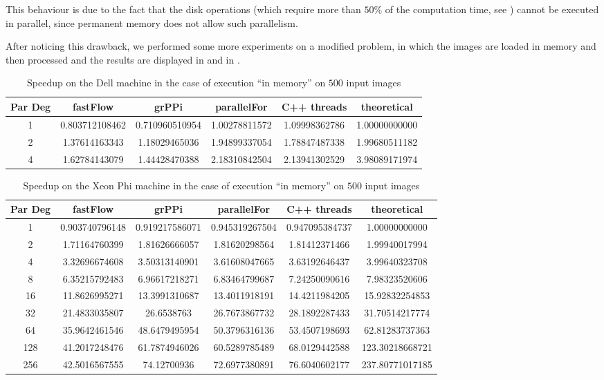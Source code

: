\documentclass[12pt,a4paper,english]{article}
\begin{document}
    This behaviour is due to the fact that the disk operations (which require more than $50\%$ of the computation time, see ) cannot be executed in parallel, since permanent memory does not allow such parallelism.

    After noticing this drawback, we performed some more experiments on a modified problem, in which the images are loaded in memory and then processed and the results are displayed in  and in .


\begin{table}[h]
\begin{tabular}{cccccc}
  {\bf Par Deg} & {\bf fastFlow} & {\bf grPPi} & {\bf parallelFor} & {\bf C++ threads} & {\bf theoretical}\\
  \toprule
1 & 0.803712108462 & 0.710960510954 & 1.00278811572 & 1.09998362786 & 1.00000000000 \\
2 & 1.37614163343 & 1.18029465036 & 1.94899337054 & 1.78847487338 & 1.99680511182 \\
4 & 1.62784143079 & 1.44428470388 & 2.18310842504 & 2.13941302529 & 3.98089171974\\
  \bottomrule
\end{tabular}\caption{Speedup on the Dell machine in the case of execution ``in memory'' on $500$ input images\label{tab:memoryDell}}
\end{table}


\begin{table}[h]
\begin{tabular}{cccccc}
  {\bf Par Deg} & {\bf fastFlow} & {\bf grPPi} & {\bf parallelFor} & {\bf C++ threads} & {\bf theoretical}\\
  \toprule
  1 & 0.903740796148 & 0.919217586071 & 0.945319267504 & 0.947095384737 & 1.00000000000 \\
2 & 1.71164760399 & 1.81626666057 & 1.81620298564 & 1.81412371466 & 1.99940017994 \\
4 & 3.32696674608 & 3.50313140901 & 3.61608047665 & 3.63192646437 & 3.99640323708\\
8 & 6.35215792483 & 6.96617218271 & 6.83464799687 & 7.24250090616 & 7.98323520606 \\
16 & 11.8626995271 & 13.3991310687 & 13.4011918191 & 14.4211984205 & 15.92832254853\\
32 & 21.4833035807 & 26.6538763 & 26.7673867732 & 28.1892287433 & 31.70514217774\\
64 & 35.9642461546 & 48.6479495954 & 50.3796316136 & 53.4507198693 & 62.81283737363 \\
128 & 41.2017248476 & 61.7874946026 & 60.5289785489 & 68.0129442588 & 123.30218668721 \\
256 & 42.5016567555 & 74.12700936 & 72.6977380891 & 76.6040602177 & 237.80771017185\\
  \bottomrule
\end{tabular}\caption{Speedup on the Xeon Phi machine in the case of execution ``in memory'' on $500$ input images\label{tab:memoryPhi}}
\end{table}
\end{document}
